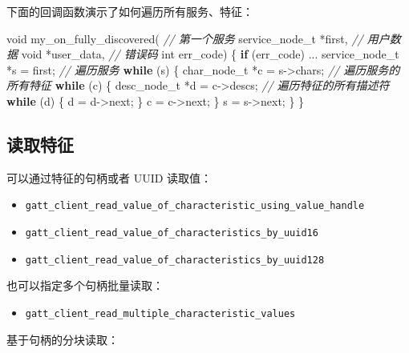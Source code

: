 \documentclass[
  12pt,
]{book}
\newenvironment{Shaded}{\begin{snugshade}}{\end{snugshade}}
\newcommand{\CommentTok}[1]{\textcolor[rgb]{0.56,0.35,0.01}{\textit{#1}}}
\newcommand{\ControlFlowTok}[1]{\textcolor[rgb]{0.13,0.29,0.53}{\textbf{#1}}}
\newcommand{\DataTypeTok}[1]{\textcolor[rgb]{0.13,0.29,0.53}{#1}}
\newcommand{\NormalTok}[1]{#1}
\providecommand{\tightlist}{%
  \setlength{\itemsep}{0pt}\setlength{\parskip}{0pt}}
\begin{document}
下面的回调函数演示了如何遍历所有服务、特征：

\begin{Shaded}
\begin{Highlighting}[]
\DataTypeTok{void}\NormalTok{ my_on_fully_discovered(}
    \CommentTok{// 第一个服务}
\NormalTok{    service_node_t *first,}
    \CommentTok{// 用户数据}
    \DataTypeTok{void}\NormalTok{ *user_data,}
    \CommentTok{// 错误码}
    \DataTypeTok{int}\NormalTok{ err_code)}
\NormalTok{\{}
    \ControlFlowTok{if}\NormalTok{ (err_code) ...}
\NormalTok{    service_node_t *s = first;}
    \CommentTok{// 遍历服务}
    \ControlFlowTok{while}\NormalTok{ (s)}
\NormalTok{    \{}
\NormalTok{        char_node_t *c = s->chars;}
        \CommentTok{// 遍历服务的所有特征}
        \ControlFlowTok{while}\NormalTok{ (c)}
\NormalTok{        \{}
\NormalTok{            desc_node_t *d = c->descs;}
            \CommentTok{// 遍历特征的所有描述符}
            \ControlFlowTok{while}\NormalTok{ (d)}
\NormalTok{            \{}
\NormalTok{                d = d->next;}
\NormalTok{            \}}
\NormalTok{            c = c->next;}
\NormalTok{        \}}
\NormalTok{        s = s->next;}
\NormalTok{    \}}
\NormalTok{\}}
\end{Highlighting}
\end{Shaded}

\hypertarget{ux8bfbux53d6ux7279ux5f81}{%
\subsection{读取特征}\label{ux8bfbux53d6ux7279ux5f81}}

可以通过特征的句柄或者 UUID 读取值：

\begin{itemize}
\tightlist
\item
  \texttt{gatt\_client\_read\_value\_of\_characteristic\_using\_value\_handle}
\item
  \texttt{gatt\_client\_read\_value\_of\_characteristics\_by\_uuid16}
\item
  \texttt{gatt\_client\_read\_value\_of\_characteristics\_by\_uuid128}
\end{itemize}

也可以指定多个句柄批量读取：

\begin{itemize}
\tightlist
\item
  \texttt{gatt\_client\_read\_multiple\_characteristic\_values}
\end{itemize}

基于句柄的分块读取：
\end{document}
